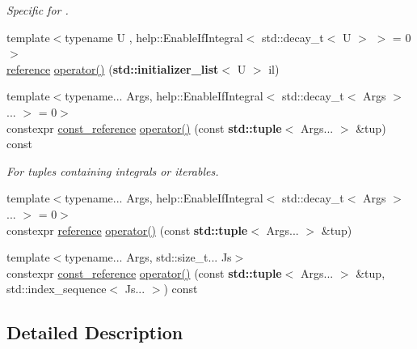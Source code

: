 \begin{DoxyCompactItemize}
\begin{DoxyCompactList}\small\item\em Specific for \textquotesingle{}. \end{DoxyCompactList}\item 
{\footnotesize template$<$typename U , help\+::\+Enable\+If\+Integral$<$ std\+::decay\+\_\+t$<$ U $>$ $>$  = 0$>$ }\\\hyperlink{structcnt_1_1help_1_1Accessor_a75659462be135d55bf8f4d6409b84a1f}{reference} \hyperlink{structcnt_1_1help_1_1Accessor_ad9d67b1bb8ab0a019e71e1a4d10739c7}{operator()} ({\bf std\+::initializer\+\_\+list}$<$ U $>$ il)
\item 
{\footnotesize template$<$typename... Args, help\+::\+Enable\+If\+Integral$<$ std\+::decay\+\_\+t$<$ Args $>$... $>$  = 0$>$ }\\constexpr \hyperlink{structcnt_1_1help_1_1Accessor_a8575d9de6bcb21a1bd6935d500cfcb89}{const\+\_\+reference} \hyperlink{structcnt_1_1help_1_1Accessor_adb43fbaf95d042436a2ec7c2b7d0d61e}{operator()} (const {\bf std\+::tuple}$<$ Args... $>$ \&tup) const 
\begin{DoxyCompactList}\small\item\em For tuples containing integrals or iterables. \end{DoxyCompactList}\item 
{\footnotesize template$<$typename... Args, help\+::\+Enable\+If\+Integral$<$ std\+::decay\+\_\+t$<$ Args $>$... $>$  = 0$>$ }\\constexpr \hyperlink{structcnt_1_1help_1_1Accessor_a75659462be135d55bf8f4d6409b84a1f}{reference} \hyperlink{structcnt_1_1help_1_1Accessor_abdfcf9908cd4fc0baa2fe3e4693f69a6}{operator()} (const {\bf std\+::tuple}$<$ Args... $>$ \&tup)
\item 
{\footnotesize template$<$typename... Args, std\+::size\+\_\+t... Js$>$ }\\constexpr \hyperlink{structcnt_1_1help_1_1Accessor_a8575d9de6bcb21a1bd6935d500cfcb89}{const\+\_\+reference} \hyperlink{structcnt_1_1help_1_1Accessor_a2e3bc15b7287554c474554e8085643d6}{operator()} (const {\bf std\+::tuple}$<$ Args... $>$ \&tup, std\+::index\+\_\+sequence$<$ Js... $>$) const 
\end{DoxyCompactItemize}



\subsection{Detailed Description}
